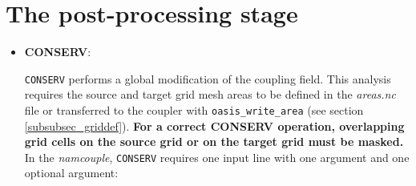 \section{The post-processing stage}
\label{subsec_cooking}

\begin{itemize}

\item {\bf CONSERV}:

  {\tt CONSERV} performs a global modification of the coupling field.
  This analysis requires the source and target grid mesh areas to be
  defined in the {\it areas.nc} file or transferred to the coupler with {\tt oasis\_write\_area} (see section
  \ref{subsubsec_griddef}). {\bf For a correct CONSERV operation,
    overlapping grid cells on the source grid or on the target grid
    must be masked.} In the {\it namcouple}, {\tt CONSERV} requires
  one input line with one argument and one optional argument:


\end{itemize}
